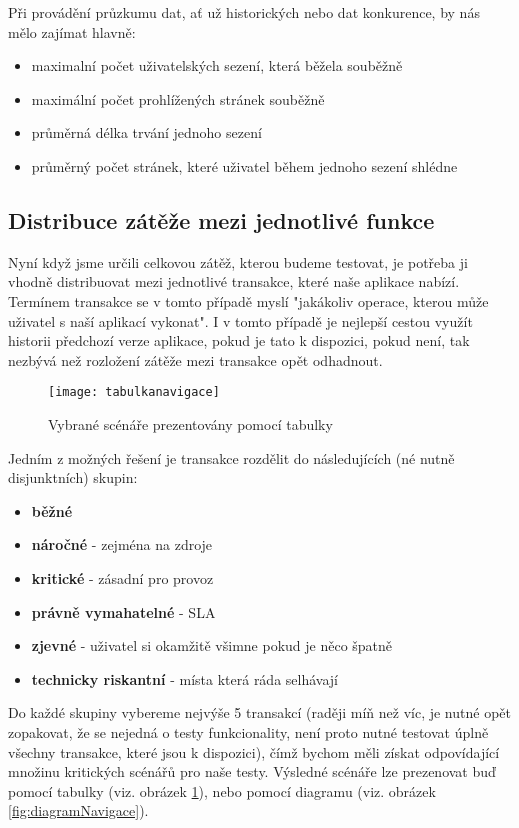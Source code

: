 \documentclass[122pt,oneside]{fithesis}
\begin{document}
Při provádění průzkumu dat, ať už historických nebo dat konkurence, by nás mělo zajímat hlavně:
	\begin{itemize}
  \item maximalní počet uživatelských sezení, která běžela souběžně
  \item maximální počet prohlížených stránek souběžně
  \item průměrná délka trvání jednoho sezení
  \item průměrný počet stránek, které uživatel během jednoho sezení shlédne
\end{itemize}

\subsection{Distribuce zátěže mezi jednotlivé funkce}

Nyní když jsme určili celkovou zátěž, kterou budeme testovat, je potřeba ji vhodně distribuovat mezi jednotlivé transakce, které naše aplikace nabízí. Termínem transakce se v tomto případě myslí "jakákoliv operace, kterou může uživatel s naší aplikací vykonat". I v tomto případě je nejlepší cestou využít historii předchozí verze aplikace, pokud je tato k dispozici, pokud není, tak nezbývá než rozložení zátěže mezi transakce opět odhadnout. 

\begin{figure}[!ht]
\centering
\texttt{[image: tabulkanavigace]}
\caption{Vybrané scénáře prezentovány pomocí tabulky~\cite{molyneaux09}}
\label{fig:tabulkaNavigace}
\end{figure}

Jedním z možných řešení je transakce rozdělit do následujících (né nutně disjunktních) skupin:
\begin{itemize}
  \item {\bf běžné}
  \item {\bf náročné} - zejména na zdroje
  \item {\bf kritické} - zásadní pro provoz
  \item {\bf právně vymahatelné} - SLA
  \item {\bf zjevné} - uživatel si okamžitě všimne pokud je něco špatně
  \item {\bf technicky riskantní} - místa která ráda selhávají
\end{itemize}

Do každé skupiny vybereme nejvýše 5 transakcí (raději míň než víc, je nutné opět zopakovat, že se nejedná o testy funkcionality, není proto nutné testovat úplně všechny transakce, které jsou k dispozici), čímž bychom měli získat odpovídající množinu kritických scénářů pro naše testy. Výsledné scénáře lze prezenovat buď pomocí tabulky (viz. obrázek \ref{fig:tabulkaNavigace}), nebo pomocí diagramu (viz. obrázek \ref{fig:diagramNavigace}).
\end{document}
